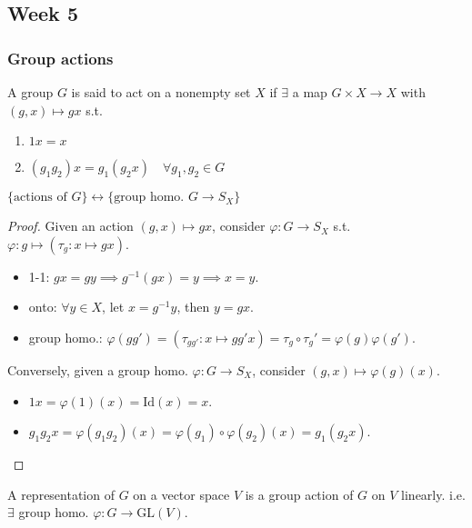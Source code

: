 \subsection{Week 5}
\subsubsection{Group actions }

\begin{definition}
  A group $G$ is said to act on a nonempty set $X$ if $\exists$ a map
  $G \times X \to X$ with $(g, x) \mapsto gx$ s.t.
  \begin{enumerate}
    \item $1x = x$
    \item $(g_1g_2)x = g_1(g_2 x) \quad \forall g_1, g_2 \in G$
  \end{enumerate}
\end{definition}

\begin{prop}
  $\{ \text{actions of $G$} \} \leftrightarrow
  \{ \text{group homo.~} G \to S_X \}$
  \begin{proof}
    Given an action $(g, x) \mapsto gx$, consider $\varphi: G \to S_X$ s.t.
    $\varphi: g \mapsto (\tau_g: x \mapsto gx)$.
    \begin{itemize}
      \item 1-1: $gx = gy \implies g^{-1}(gx) = y \implies x = y$.
      \item onto: $\forall y \in X$, let $x = g^{-1}y$, then $y = gx$.
      \item group homo.: $\varphi(gg') = (\tau_{gg'}: x \mapsto gg'x)
        = \tau_g \circ \tau_g' = \varphi(g)\varphi(g')$.
    \end{itemize}
    Conversely, given a group homo. $\varphi: G \to S_X$, consider
    $(g, x) \mapsto \varphi(g)(x)$.
    \begin{itemize}
      \item $1x = \varphi(1)(x) = \text{Id}(x) = x$.
      \item $g_1g_2x = \varphi(g_1g_2)(x) = \varphi(g_1) \circ \varphi(g_2)(x)
        = g_1(g_2x)$. \qedhere
    \end{itemize}
  \end{proof}
\end{prop}

\begin{definition}
  A representation of $G$ on a vector space $V$ is a group action of $G$ on
  $V$ linearly. i.e. $\exists$ group homo. $\varphi: G \to \text{GL}(V)$.
\end{definition}

